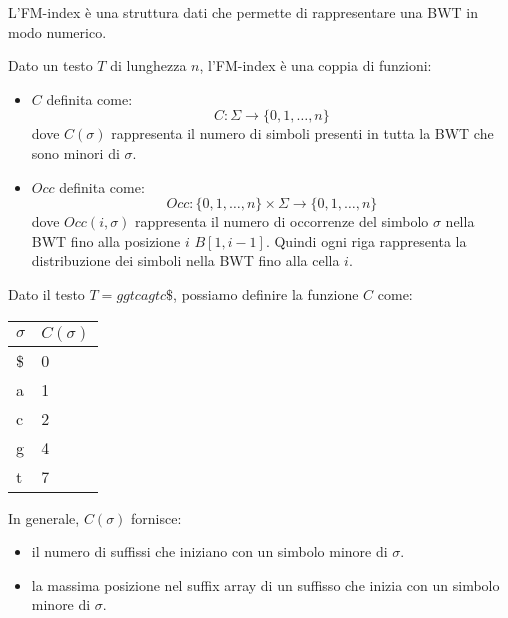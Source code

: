 L'FM-index è una struttura dati che permette di rappresentare una BWT in modo
numerico.
\begin{definizione}
    Dato un testo $T$ di lunghezza $n$, l'FM-index è una coppia di funzioni:
    \begin{itemize}
        \item $C$ definita come:
              \begin{equation}
                  C: \Sigma \to \{0, 1, \dots, n\}
              \end{equation}
              dove $C(\sigma)$ rappresenta il numero di simboli presenti in tutta la BWT che sono
              minori di $\sigma$.
        \item $Occ$ definita come:
              \begin{equation}
                  Occ: \{0, 1, \dots, n\} \times \Sigma \to \{0, 1, \dots, n\}
              \end{equation}
              dove $Occ(i, \sigma)$ rappresenta il numero di occorrenze del simbolo
              $\sigma$ nella BWT fino alla posizione $i$ $B[1, i - 1]$. Quindi ogni
              riga rappresenta la distribuzione dei simboli nella BWT fino alla
              cella $i$.
    \end{itemize}
\end{definizione}
\begin{esempio}
    Dato il testo $T=ggtcagtc\$$, possiamo definire la funzione $C$ come:
    \begin{table}[!ht]
        \centering
        \begin{tabular}{|l|l|}
            \hline
            $\sigma$ & $C(\sigma)$ \\ \hline
            \$       & 0           \\ \hline
            a        & 1           \\ \hline
            c        & 2           \\ \hline
            g        & 4           \\ \hline
            t        & 7           \\ \hline
        \end{tabular}
    \end{table}
\end{esempio}
In generale, $C(\sigma)$ fornisce:
\begin{itemize}
    \item il numero di suffissi che iniziano con un simbolo minore di $\sigma$.
    \item la massima posizione nel suffix array di un suffisso che inizia con un
          simbolo minore di $\sigma$.
\end{itemize}
